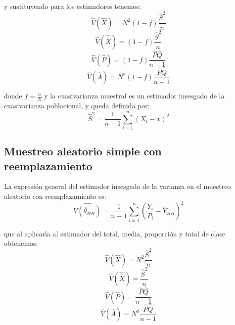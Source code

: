y sustituyendo para los estimadores tenemos: \\

\begin{equation}\label{eq:8}
    \hat{V}(\hat{X}) = N^2(1-f)\frac{\hat{S}^2}{n}
\end{equation}
\begin{equation}\label{eq:9}
    \hat{V}(\hat{\bar{X}}) = (1-f)\frac{\hat{S}^2}{n}
\end{equation}    
\begin{equation}\label{eq:10}
    \hat{V}(\hat{P}) = (1-f)\frac{\hat{P}\hat{Q}}{n-1}
\end{equation}
\begin{equation}\label{eq:11}
    \hat{V}(\hat{A}) = N^2(1-f)\frac{\hat{P}\hat{Q}}{n-1}
\end{equation}

donde $f=\frac{n}{N}$ y la cuasivarianza muestral es un estimador insesgado de la cuasivarianza poblacional, y queda definida por:\\

\begin{equation}\label{eq:12}
    \hat{S}^2 = \frac{1}{n-1}\sum_{i=1}^{n}(X_i-\bar{x})^2
\end{equation}

\subsection{Muestreo aleatorio simple con reemplazamiento} \label{sect:4.3.2}
La expresión general del estimador insesgado de la varianza en el muestreo aleatorio con reemplazamiento es:\\
\begin{equation}\label{eq:13}
    \widehat{V(\hat{\theta}_{HH})} = \frac{1}{n-1}\sum_{i=1}^{n}(\frac{Y_i}{P_i}-\hat{Y}_{HH})^2
\end{equation}

que al aplicarla al estimador del total, media, proporción y total de clase obtenemos:\\

\begin{equation}\label{eq:14}
    \hat{V}(\hat{X}) = N^2\frac{\hat{S}^2}{n}
\end{equation}
\begin{equation}\label{eq:15}
    \hat{V}(\hat{\bar{X}}) = \frac{\hat{S}^2}{n}
\end{equation}    
\begin{equation}\label{eq:16}
    \hat{V}(\hat{P}) = \frac{\hat{P}\hat{Q}}{n-1}
\end{equation}
\begin{equation}\label{eq:17}
    \hat{V}(\hat{A}) = N^2\frac{\hat{P}\hat{Q}}{n-1}
\end{equation}

